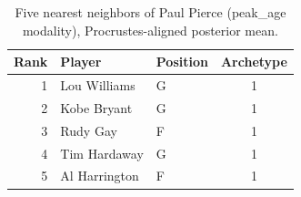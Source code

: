 \begin{table}[htbp]
  \centering\small
  \begin{tabular}{rllc}
    \toprule
    Rank & Player & Position & Archetype \\
    \midrule
    1 & Lou Williams & G & 1 \\
    2 & Kobe Bryant & G & 1 \\
    3 & Rudy Gay & F & 1 \\
    4 & Tim Hardaway & G & 1 \\
    5 & Al Harrington & F & 1 \\
    \bottomrule
  \end{tabular}
  \caption{Five nearest neighbors of Paul Pierce (peak_age modality), Procrustes-aligned posterior mean.}
  \label{tab:Paul_Pierce_neighbors_peak_age}
\end{table}

